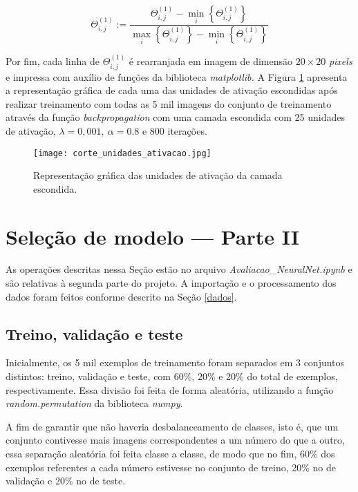 \documentclass[12pt]{article}
\begin{document}
\begin{equation} \label{scaling}
\Theta^{(1)}_{i,j} := \frac{ \Theta^{(1)}_{i,j} - \min\limits_i\left\{\Theta^{(1)}_{i,j}\right\}}{\max\limits_i\left\{\Theta^{(1)}_{i,j}\right\} - \min\limits_i\left\{\Theta^{(1)}_{i,j}\right\}}
\end{equation}

Por fim, cada linha de $\Theta^{(1)}_{i,j}$ é rearranjada em imagem de dimensão $20 \times 20$ \textit{pixels} e impressa com auxílio de funções da biblioteca \textit{matplotlib.} A Figura \ref{img_un_escond} apresenta a representação gráfica de cada uma das unidades de ativação escondidas após realizar treinamento com todas as 5 mil imagens do conjunto de treinamento através da função \textit{backpropagation} com uma camada escondida com 25 unidades de ativação, $\lambda = 0,001, \ \alpha = 0.8$ e 800 iterações.

\begin{figure} [h]
\begin{center}
\texttt{[image: corte\_unidades\_ativacao.jpg]}
\caption{Representação gráfica das unidades de ativação da camada escondida.} \label{img_un_escond}
\end{center}
\end{figure}

\section{Seleção de modelo --- Parte II} \label{parte2}
As operações descritas nessa Seção estão no arquivo \textit{Avaliacao\_NeuralNet.ipynb} e são relativas à segunda parte do projeto. A importação e o processamento dos dados foram feitos conforme descrito na Seção \ref{dados}.


\subsection{Treino, validação e teste} \label{treino, val, teste}
\indent Inicialmente, os 5 mil exemplos de treinamento foram separados em 3 conjuntos distintos: treino, validação e teste, com 60\%, 20\% e 20\% do total de exemplos, respectivamente. Essa divisão foi feita de forma aleatória, utilizando a função \textit{random.permutation} da biblioteca \textit{numpy}.

A fim de garantir que não haveria desbalanceamento de classes, isto é, que um conjunto contivesse mais imagens correspondentes a um número do que a outro, essa separação aleatória foi feita classe a classe, de modo que no fim, 60\% dos exemplos referentes a cada número estivesse no conjunto de treino, 20\% no de validação e 20\% no de teste.
\end{document}
